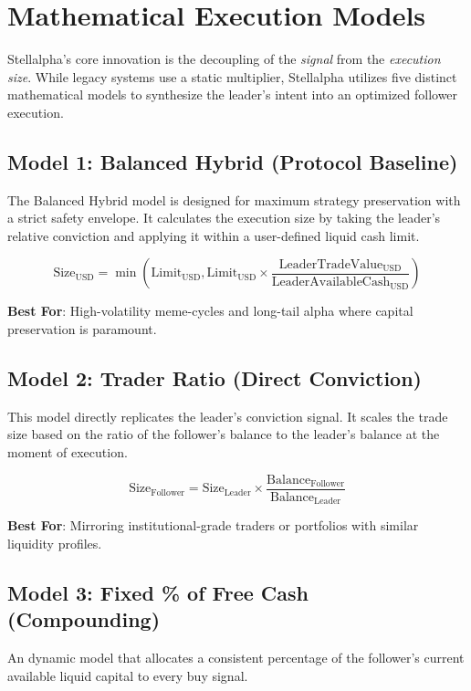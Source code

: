 \section{Mathematical Execution Models}

Stellalpha's core innovation is the decoupling of the \textit{signal} from the \textit{execution size}. While legacy systems use a static multiplier, Stellalpha utilizes five distinct mathematical models to synthesize the leader's intent into an optimized follower execution.

\subsection{Model 1: Balanced Hybrid (Protocol Baseline)}

The Balanced Hybrid model is designed for maximum strategy preservation with a strict safety envelope. It calculates the execution size by taking the leader's relative conviction and applying it within a user-defined liquid cash limit.

\[
\text{Size}_{\text{USD}} = \min\left( \text{Limit}_{\text{USD}}, \text{Limit}_{\text{USD}} \times \frac{\text{LeaderTradeValue}_{\text{USD}}}{\text{LeaderAvailableCash}_{\text{USD}}} \right)
\]

\textbf{Best For}: High-volatility meme-cycles and long-tail alpha where capital preservation is paramount.

\subsection{Model 2: Trader Ratio (Direct Conviction)}

This model directly replicates the leader's conviction signal. It scales the trade size based on the ratio of the follower's balance to the leader's balance at the moment of execution.

\[
\text{Size}_{\text{Follower}} = \text{Size}_{\text{Leader}} \times \frac{\text{Balance}_{\text{Follower}}}{\text{Balance}_{\text{Leader}}}
\]

\textbf{Best For}: Mirroring institutional-grade traders or portfolios with similar liquidity profiles.

\subsection{Model 3: Fixed \% of Free Cash (Compounding)}

An dynamic model that allocates a consistent percentage of the follower's current available liquid capital to every buy signal.

